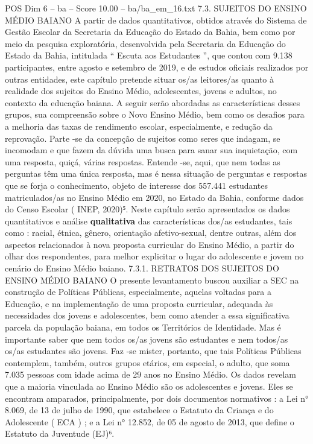 \begin{textsample}{POS Dim 6 – ba – Score 10.00 – ba/ba\_em\_16.txt}  \label{ex:f6_pos_073}
7.3.
SUJEITOS DO ENSINO MÉDIO BAIANO A partir de dados quantitativos, obtidos através do Sistema de Gestão Escolar da Secretaria da Educação do Estado da Bahia, bem como por meio da pesquisa exploratória, desenvolvida pela Secretaria da Educação do Estado da Bahia, intitulada “ Escuta aos Estudantes ”, que contou com 9.138 participantes, entre agosto e setembro de 2019, e de estudos oficiais realizados por outras entidades, este capítulo pretende situar os/as leitores/as quanto à realidade dos sujeitos do Ensino Médio, adolescentes, jovens e adultos, no contexto da educação baiana.
A seguir serão abordadas as características desses grupos, sua compreensão sobre o Novo Ensino Médio, bem como os desafios para a melhoria das taxas de rendimento escolar, especialmente, e redução da reprovação.
Parte -se da concepção de sujeitos como seres que indagam, se incomodam e que fazem da dúvida uma busca para sanar sua inquietação, com uma resposta, quiçá, várias respostas.
Entende -se, aqui, que nem todas as perguntas têm uma única resposta, mas é nessa situação de perguntas e respostas que se forja o conhecimento, objeto de interesse dos 557.441 estudantes matriculados/as no Ensino Médio em 2020, no Estado da Bahia, conforme dados do Censo Escolar ( INEP, 2020)⁵.
Neste capítulo serão apresentados os dados quantitativos e análise \textbf{qualitativa} das características dos/as estudantes, tais como : racial, étnica, gênero, orientação afetivo-sexual, dentre outras, além dos aspectos relacionados à nova proposta curricular do Ensino Médio, a partir do olhar dos respondentes, para melhor explicitar o lugar do adolescente e jovem no cenário do Ensino Médio baiano. 7.3.1.
RETRATOS DOS SUJEITOS DO ENSINO MÉDIO BAIANO O presente levantamento buscou auxiliar a SEC na construção de Políticas Públicas, especialmente, aquelas voltadas para a Educação, e na implementação de uma proposta curricular, adequada às necessidades dos jovens e adolescentes, bem como atender a essa significativa parcela da população baiana, em todos os Territórios de Identidade.
Mas é importante saber que nem todos os/as jovens são estudantes e nem todos/as os/as estudantes são jovens.
Faz -se mister, portanto, que tais Políticas Públicas contemplem, também, outros grupos etários, em especial, o adulto, que soma 7.035 pessoas com idade acima de 29 anos no Ensino Médio.
Os dados revelam que a maioria vinculada ao Ensino Médio são os adolescentes e jovens.
Eles se encontram amparados, principalmente, por dois documentos normativos : a Lei n{\EmojiFont °} 8.069, de 13 de julho de 1990, que estabelece o Estatuto da Criança e do Adolescente ( ECA ) ; e a Lei n{\EmojiFont °} 12.852, de 05 de agosto de 2013, que define o Estatuto da Juventude (EJ)⁶.

\end{textsample}
